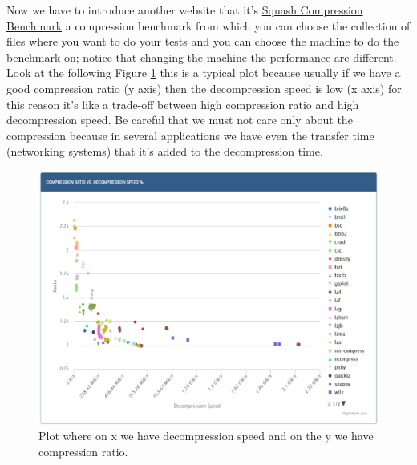 Now we have to introduce another website that it's \href{https://quixdb.github.io/squash-benchmark/}{Squash Compression Benchmark} a compression benchmark from which you can choose the collection of files where you want to do your tests and you can choose the machine to do the benchmark on; notice that changing the machine the performance are different.\newline
Look at the following Figure \ref{fig:plotratio} this is a typical plot because usually if we have a good compression ratio (y axis) then the decompression speed is low (x axis) for this reason it's like a trade-off between high compression ratio and high decompression speed. Be careful that we must not care only about the compression because in several applications we have even the transfer time (networking systems) that it's added to the decompression time.\newline
\begin{figure}
    \centering
    \includegraphics[width=0.75\linewidth]{images/compressionratio.PNG}
    \caption{Plot where on x we have decompression speed and on the y we have compression ratio.}
    \label{fig:plotratio}
\end{figure}
